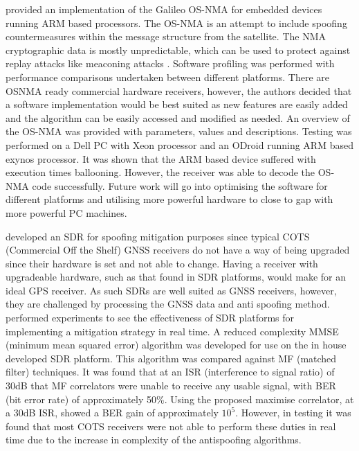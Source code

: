 \textcite{RN36} provided an implementation of the Galileo OS-NMA for embedded devices running ARM based processors. The OS-NMA is an
attempt to include spoofing countermeasures within the message structure from the satellite. The
NMA cryptographic data is mostly unpredictable, which can be used to protect against replay attacks like meaconing attacks \cite{RN37}.
Software profiling was performed with performance comparisons undertaken
between different platforms. There are OSNMA ready commercial hardware receivers, however, the authors decided that a software implementation would be best suited as new
features are easily added and the algorithm can be easily accessed and modified as needed. An overview of the OS-NMA was provided with parameters, values and
descriptions. Testing was performed on a Dell PC with Xeon processor and an ODroid running ARM based exynos processor. It was shown that the ARM based device suffered
with execution times ballooning. However, the receiver was able to decode the OS-NMA code successfully. Future work will go into optimising the software for different
platforms and utilising more powerful hardware to close to gap with more powerful PC machines.

\textcite{RN18} developed an SDR for spoofing mitigation purposes since typical COTS (Commercial Off the Shelf) GNSS receivers do not have a way of being upgraded since their hardware is set and
not able to change. Having a receiver with upgradeable hardware, such as that found in SDR platforms, would make for an ideal GPS receiver. As such SDRs are well suited
as GNSS receivers, however, they are challenged by processing the GNSS data and anti spoofing method. \citeauthor{RN18} performed experiments to see the effectiveness of SDR
platforms for implementing a mitigation strategy in real time. A reduced complexity MMSE (minimum mean squared error) algorithm was developed for use on the in house
developed SDR platform. This algorithm was compared against MF (matched filter) techniques. It was found that at an ISR (interference to signal ratio) of 30dB that MF
correlators were unable to receive any usable signal, with BER (bit error rate) of approximately 50\%. Using the proposed maximise correlator, at a 30dB ISR, showed a BER
gain of approximately $10^5$. However, in testing it was found that most COTS receivers were not able to perform these duties in real time due to the increase in
complexity of the antispoofing algorithms.

